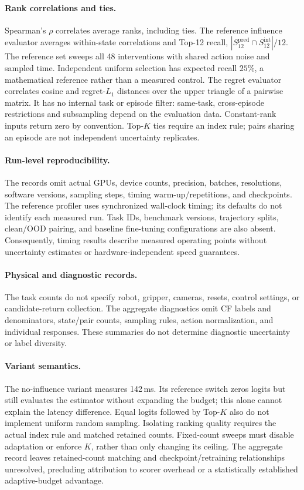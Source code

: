 \documentclass{article}
\begin{document}
\paragraph{Rank correlations and ties.}
Spearman's $\rho$ correlates average ranks, including ties. The reference influence evaluator averages within-state correlations and Top-12 recall, $|S_{12}^{\mathrm{pred}}\cap S_{12}^{\mathrm{int}}|/12$. The reference set sweeps all 48 interventions with shared action noise and sampled time. Independent uniform selection has expected recall $25\%$, a mathematical reference rather than a measured control. The regret evaluator correlates cosine and regret-$L_1$ distances over the upper triangle of a pairwise matrix. It has no internal task or episode filter: same-task, cross-episode restrictions and subsampling depend on the evaluation data. Constant-rank inputs return zero by convention. Top-$K$ ties require an index rule; pairs sharing an episode are not independent uncertainty replicates.

\paragraph{Run-level reproducibility.}
The records omit actual GPUs, device counts, precision, batches, resolutions, software versions, sampling steps, timing warm-up/repetitions, and checkpoints. The reference profiler uses synchronized wall-clock timing; its defaults do not identify each measured run. Task IDs, benchmark versions, trajectory splits, clean/OOD pairing, and baseline fine-tuning configurations are also absent. Consequently, timing results describe measured operating points without uncertainty estimates or hardware-independent speed guarantees.

\paragraph{Physical and diagnostic records.}
The task counts do not specify robot, gripper, cameras, resets, control settings, or candidate-return collection. The aggregate diagnostics omit CF labels and denominators, state/pair counts, sampling rules, action normalization, and individual responses. These summaries do not determine diagnostic uncertainty or label diversity.

\paragraph{Variant semantics.}
The no-influence variant measures 142\,ms. Its reference switch zeros logits but still evaluates the estimator without expanding the budget; this alone cannot explain the latency difference. Equal logits followed by Top-$K$ also do not implement uniform random sampling. Isolating ranking quality requires the actual index rule and matched retained counts. Fixed-count sweeps must disable adaptation or enforce $K$, rather than only changing its ceiling. The aggregate record leaves retained-count matching and checkpoint/retraining relationships unresolved, precluding attribution to scorer overhead or a statistically established adaptive-budget advantage.
\end{document}
